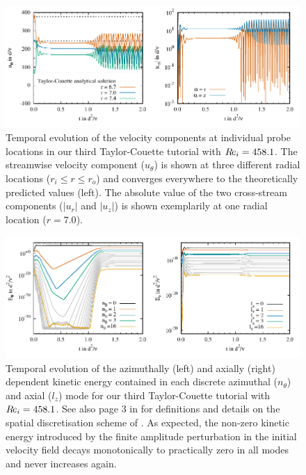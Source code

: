 \documentclass[a4paper, 11pt, DIV=11]{scrartcl}
\begin{document}
\begin{figure}[htb]
\centering
\includegraphics[scale=1.00]{figures/tc0042/probes}
\caption{Temporal evolution of the velocity components at individual probe 
locations in our third Taylor-Couette tutorial  with $R\hspace{-0.1em}e_{i}=\num{458.1}$.
The streamwise velocity component ($u_{\theta}$) is shown 
at three different radial locations ($r_{i}\le r\le r_{o}$) and converges 
everywhere to the theoretically predicted values (left). The absolute value of
the two cross-stream components ($|u_r|$ and $|u_z|$) is shown exemplarily at
one radial location ($r=\num{7.0}$).}
\label{fig:tc0042probes}
\end{figure}

\begin{figure}[htb]
\centering
\includegraphics[scale=1.00]{figures/tc0042/keThZ.pdf}
\caption{Temporal evolution of the azimuthally (left) and axially (right) 
dependent kinetic energy contained in each discrete azimuthal ($n_{\theta}$)
and axial ($l_{z}$) mode for our third Taylor-Couette tutorial 
with $R\hspace{-0.1em}e_{i}=\num{458.1}$. See also page 3 in \cite{Shi2015} for definitions and 
details on the spatial discretisation scheme of \nsc. As expected, the non-zero 
kinetic energy introduced by the finite amplitude perturbation in the initial 
velocity field decays monotonically to practically zero in all modes and never 
increases again.}
\label{fig:tc0042keThZ}
\end{figure}
\end{document}
